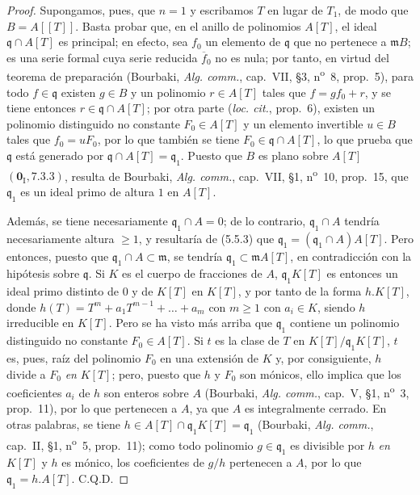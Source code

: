 \begin{proof}
Supongamos, pues, que $n=1$ y escribamos $T$ en lugar de $T_1$, de modo que $B=A[[T]]$.
Basta probar que, en el anillo de polinomios $A[T]$, el ideal
$\mathfrak q\cap A[T]$ es principal;
en efecto, sea $f_0$ un elemento de $\mathfrak q$ que no pertenece a $\mathfrak mB$;
es una serie formal cuya serie reducida $\overline f_0$ no es nula; por tanto,
en virtud del teorema de preparación (Bourbaki, \emph{Alg. comm.}, cap.~VII, \S3,
n\textsuperscript{o}~8, prop.~5), para todo $f\in\mathfrak q$ existen $g\in B$ y
un polinomio $r\in A[T]$ tales que $f=gf_0+r$, y se tiene entonces
$r\in\mathfrak q\cap A[T]$; por otra parte (\emph{loc. cit.}, prop.~6), existen un
polinomio distinguido no constante $F_0\in A[T]$ y un elemento invertible $u\in B$ tales
que $f_0=uF_0$, por lo que también se tiene $F_0\in\mathfrak q\cap A[T]$, lo que prueba que
$\mathfrak q$ está generado por $\mathfrak q\cap A[T]=\mathfrak q_1$. Puesto que $B$
es plano sobre $A[T]$ $(\mathbf 0_{\mathrm I}, 7.3.3)$, resulta de Bourbaki,
\emph{Alg. comm.}, cap.~VII, \S1, n\textsuperscript{o}~10, prop.~15, que
$\mathfrak q_1$ es un ideal primo de altura $1$ en $A[T]$.

Además, se tiene necesariamente $\mathfrak q_1\cap A=0$; de lo contrario,
$\mathfrak q_1\cap A$ tendría necesariamente altura $\geq1$, y resultaría de
(5.5.3) que $\mathfrak q_1=(\mathfrak q_1\cap A)A[T]$. Pero entonces,
puesto que $\mathfrak q_1\cap A\subset\mathfrak m$, se tendría
$\mathfrak q_1\subset\mathfrak mA[T]$, en contradicción con la hipótesis sobre
$\mathfrak q$. Si $K$ es el cuerpo de fracciones de $A$, $\mathfrak q_1K[T]$ es
entonces un ideal primo distinto de $0$ y de $K[T]$ en $K[T]$, y por tanto de la forma
$h.K[T]$, donde
$h(T)=T^m+a_1T^{m-1}+\ldots+a_m$ con $m\geq1$
con $a_i\in K$, siendo $h$ irreducible en $K[T]$. Pero se ha visto más arriba que
$\mathfrak q_1$ contiene un polinomio distinguido no constante $F_0\in A[T]$. Si $t$
es la clase de $T$ en $K[T]/\mathfrak q_1K[T]$, $t$ es, pues, raíz del polinomio
$F_0$ en una extensión de $K$ y, por consiguiente, $h$ divide a $F_0$ \emph{en} $K[T]$; pero,
puesto que $h$ y $F_0$ son mónicos, ello implica que los coeficientes $a_i$ de $h$
son enteros sobre $A$ (Bourbaki, \emph{Alg. comm.}, cap.~V, \S1,
n\textsuperscript{o}~3, prop.~11), por lo que pertenecen a $A$, ya que $A$ es
integralmente cerrado. En otras palabras, se tiene
$h\in A[T]\cap\mathfrak q_1K[T]=\mathfrak q_1$
(Bourbaki, \emph{Alg. comm.}, cap.~II, \S1, n\textsuperscript{o}~5, prop.~11);
como todo polinomio $g\in\mathfrak q_1$ es divisible por $h$ \emph{en} $K[T]$ y $h$
es mónico, los coeficientes de $g/h$ pertenecen a $A$, por lo que
$\mathfrak q_1=h.A[T]$. C.Q.D.
\end{proof}

